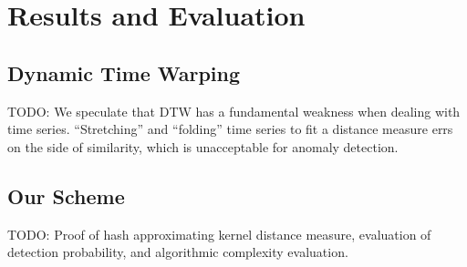 \documentclass[a4paper]{article}
\makeatletter
\theoremstyle{def}
\theoremstyle{thm}
\newcommand{\todo}[1]{}
\renewcommand{\todo}[1]{{\color{red} TODO\@: {#1}}}
\makeatother
\begin{document}
\section{Results and Evaluation}

\subsection{Dynamic Time Warping}

\todo{We speculate that DTW has a fundamental weakness when dealing with time series.
    ``Stretching'' and ``folding'' time series to fit a distance measure errs on the side of similarity, which is unacceptable for anomaly detection.}

\subsection{Our Scheme}

\todo{Proof of hash approximating kernel distance measure, evaluation of detection probability, and algorithmic complexity evaluation.}



\end{document}
